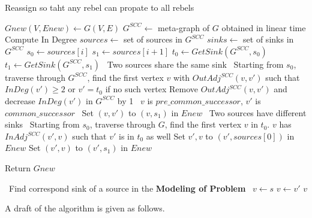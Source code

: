 \documentclass[12pt,a4paper]{article}
\renewcommand{\Comment}[1]{\beginComment~#1~\endComment}
\begin{document}
\begin{algorithm}
\caption{Reassign so taht any rebel can propate to all rebels}
\begin{algorithmic}
    \State $Gnew(V,Enew) \gets G(V,E)$
    \State $G^{SCC} \gets$ meta-graph of $G$ obtained in linear time
    \State Compute In Degree 
    \State $sources \gets$ set of sources in $G^{SCC}$
    \State $sinks \gets$ set of sinks in $G^{SCC}$
      \State $s_0 \gets sources[i]$
      \State $s_1 \gets sources[i + 1]$
      \State $t_0 \gets GetSink(G^{SCC}, s_0)$
      \State $t_1 \gets GetSink(G^{SCC}, s_1)$
        \State \Comment{Two sources share the same sink}
        \State Starting from $s_0$, traverse through $G^{SCC}$, find the first vertex $v$ with
        \State $OutAdj^{SCC}(v,v')$ such that $InDeg(v') \ge 2$ or $v' = t_0$ if no such vertex
        \State Remove $OutAdj^{SCC}(v,v')$ and decrease $InDeg(v')$ in $G^{SCC}$ by 1
        \State \Comment{$v$ is $pre\_common\_successor$, $v'$ is $common\_successor$}
        \State Set $(v, v')$ to $(v,s_1)$ in $Enew$
      \Else 
      \State \Comment{Two sources have different sinks}
        \State Starting from $s_0$, traverse through $G$, find the first vertex $v$ in $t_0$. 
        \State $v$ has $InAdj^{SCC}(v',v)$ such that $v'$ is in $t_0$ as well
          \State Set ${v',v}$ to $(v', sources[0])$ in $Enew$
        \Else
          \State Set $(v',v)$ to $(v', s_1)$ in $Enew$
        \EndIf
        
      \EndIf

    \EndFor
    \State Return $Gnew$
  \EndFunction

  \vspace{0.4cm}

  \State \Comment{Find correspond sink of a source in the \textbf{Modeling of Problem}}
    \State $v \gets s$
      \State $v \gets v'$
    \EndWhile
    \State \Return $v$
  \EndFunction
\end{algorithmic}
\end{algorithm}

A draft of the algorithm is given as follows.
\end{document}
